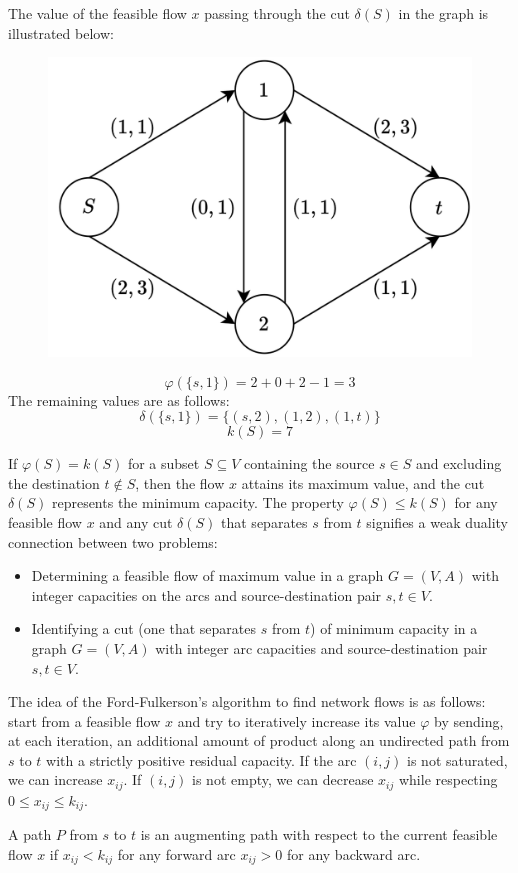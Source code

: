 \begin{example}
    The value of the feasible flow $x$ passing through the cut $\delta(S)$  in the graph is illustrated below:
    \begin{figure}[H]
        \centering
        \includegraphics[width=0.4\linewidth]{images/flow.png}
    \end{figure}
    \[\varphi(\{s,1\})=2+0+2-1=3\]
    The remaining values are as follows: 
    \[\delta(\{s,1\})=\{(s, 2),(1,2),(1, t)\}\]
    \[k(S)=7\]
\end{example}
If $\varphi(S) = k(S)$ for a subset $S \subseteq V$ containing the source $s \in S$ and excluding the destination $t \notin S$, then the flow $x$ attains its maximum value, and the cut $\delta(S)$ represents the minimum capacity. 
The property $\varphi(S) \leq k(S)$ for any feasible flow $x$ and any cut $\delta(S)$ that separates $s$ from $t$ signifies a weak duality connection between two problems:
\begin{itemize}
    \item Determining a feasible flow of maximum value in a graph $G = (V, A)$ with integer capacities on the arcs and source-destination pair $s, t \in V$.
    \item Identifying a cut (one that separates $s$ from $t$) of minimum capacity in a graph $G = (V, A)$ with integer arc capacities and source-destination pair $s, t \in V$.
\end{itemize} 
The idea of the Ford-Fulkerson's algorithm to find network flows is as follows: start from a feasible flow $x$ and try to iteratively increase its value $\varphi$ by sending, at each iteration, an additional amount of product along an undirected path from $s$ to $t$ with a strictly positive residual capacity. 
If the arc $(i,j)$ is not saturated, we can increase $x_{ij}$. 
If $(i,j)$ is not empty, we can decrease $x_{ij}$ while respecting $0 \leq x_{ij} \leq k_{ij}$. 
\begin{definition}
    A path $P$ from $s$ to $t$ is an augmenting path with respect to the current feasible flow $x$ if $x_{ij}<k_{ij}$ for any forward arc $x_{ij}>0$ for any backward arc. 
\end{definition}
